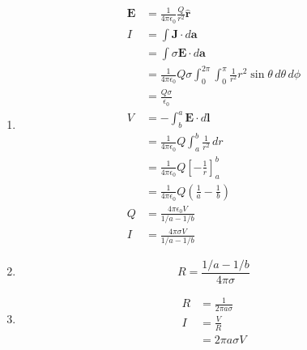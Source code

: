 \documentclass{article}
\renewcommand{\vec}[1]{\boldsymbol{\mathbf{#1}}}
\newcommand{\uvec}[1]{\hat{\vec{#1}}}
\newcommand{\ke}{\frac{1}{4 \pi \epsilon_0}}
\begin{document}
\begin{enumerate}
  \item

        \begin{align*}
          \vec{E} & = \ke \frac{Q}{r^2} \uvec{r}                                                               \\
          I       & = \int \vec{J} \cdot d \vec{a}                                                             \\
                  & = \int \sigma \vec{E} \cdot d \vec{a}                                                      \\
                  & = \ke Q \sigma \int_0^{2 \pi} \int_0^\pi \frac{1}{r^2} r^2 \sin \theta \,d \theta \,d \phi \\
                  & = \frac{Q \sigma}{\epsilon_0}                                                              \\
          V       & = -\int_b^a \vec{E} \cdot d \vec{l}                                                        \\
                  & = \ke Q \int_a^b \frac{1}{r^2} \,d r                                                       \\
                  & = \ke Q \left[ -\frac{1}{r} \right]_a^b                                                    \\
                  & = \ke Q \left( \frac{1}{a} - \frac{1}{b} \right)                                           \\
          Q       & = \frac{4 \pi \epsilon_0 V}{1 / a - 1 / b}                                                 \\
          I       & = \frac{4 \pi \sigma V}{1 / a - 1 / b}
        \end{align*}

  \item \[R = \frac{1 / a - 1 / b}{4 \pi \sigma}\]

  \item

        \begin{align*}
          R & = \frac{1}{2 \pi a \sigma} \\
          I & = \frac{V}{R}              \\
            & = 2 \pi a \sigma V
        \end{align*}
\end{enumerate}

\subsection{}
\end{document}

